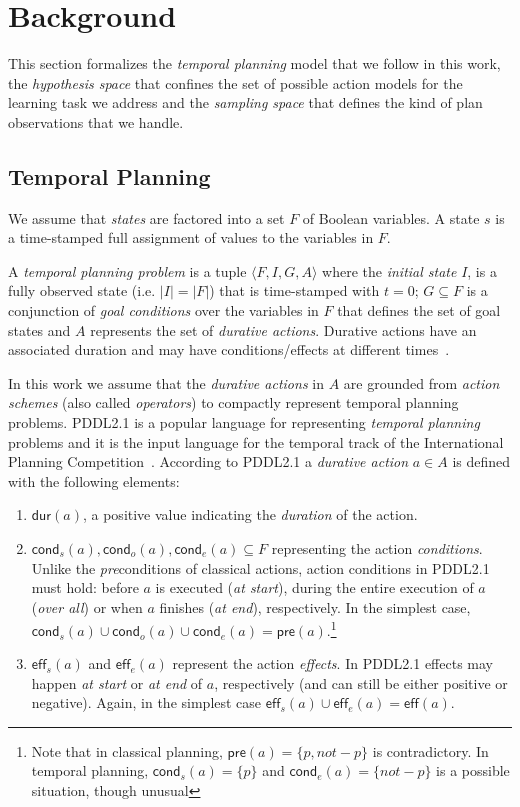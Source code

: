 \documentclass{ecai}
\newcommand{\tup}[1]{{\langle #1 \rangle}}
\newcommand{\pre}{\mathsf{pre}}    %
\newcommand{\eff}{\mathsf{eff}}    %
\newcommand{\cond}{\mathsf{cond}}  %
\newcommand{\dur}{\mathsf{dur}}    %
\begin{document}
\section{Background}
This section formalizes the {\em temporal planning} model that we follow in this work, the {\em hypothesis space} that confines the set of possible action models for the learning task we address and the {\em sampling space} that defines the kind of plan observations that we handle.

\subsection{Temporal Planning}
\label{sec:temporalplanning}
We assume that {\em states} are factored into a set $F$ of Boolean variables. A state $s$ is a time-stamped full assignment of values to the variables in $F$. 

A {\em temporal planning problem} is a tuple $\tup{F,I,G,A}$ where the {\em initial state} $I$, is a fully observed state (i.e. $|I|=|F|$) that is time-stamped with $t=0$; $G \subseteq F$ is a conjunction of {\em goal conditions} over the variables in $F$ that defines the set of goal states and $A$ represents the set of {\em durative actions}. Durative actions have an associated duration and may have conditions/effects at different times~\cite{vidal2006branching,garrido2009constraint}.

In this work we assume that the {\em durative actions} in $A$ are grounded from {\em action schemes} (also called {\em operators}) to compactly represent temporal planning problems. PDDL2.1 is a popular language for representing {\em temporal planning} problems and it is the input language for the temporal track of the International Planning Competition~\cite{fox2003pddl2,ghallab2004automated}. According to PDDL2.1 a {\em durative action} $a\in A$ is defined with the following elements:
\begin{enumerate}
\item $\dur(a)$, a positive value indicating the {\em duration} of the action.
\item $\cond_s(a), \cond_o(a), \cond_e(a) \subseteq F$ representing the action {\em conditions}. Unlike the \emph{pre}conditions of classical actions, action conditions in PDDL2.1 must hold: before $a$ is executed ({\em at start}), during the entire execution of $a$ ({\em over all}) or when $a$ finishes ({\em at end}), respectively. In the simplest case, $\cond_s(a) \cup \cond_o(a) \cup \cond_e(a) = \pre(a).$\footnote{Note that in classical planning, $\pre(a)=\{p,not-p\}$ is contradictory. In temporal planning, $\cond_s(a)=\{p\}$ and $\cond_e(a)=\{not-p\}$ is a possible situation, though unusual}
\item $\eff_s(a)$ and $\eff_e(a)$ represent the action {\em effects}. In PDDL2.1 effects may happen {\em at start} or {\em at end} of $a$, respectively (and can still be either positive or negative). Again, in the simplest case $\eff_s(a) \cup \eff_e(a) = \eff(a)$.
\end{enumerate}
\end{document}
